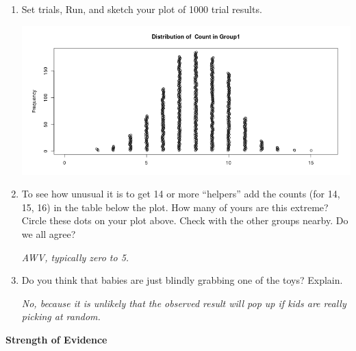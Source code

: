 \begin{enumerate}
\begin{key}
{\it 12 in my first, 8 in my second }
\end{key}

    \item  Set   trials, Run, and   
              sketch your plot of 1000 trial results. 
\begin{students}
  \vspace{4cm}
\end{students}

\begin{key}
    \includegraphics[width=.8\linewidth]{../plots/Helper16.png}
\end{key}
\item To see how unusual it is to get 14 or more ``helpers'' add the
  counts (for 14, 15, 16) in the table below the plot.
   How many of yours are this extreme? Circle
  these dots on your plot above. Check with the other groups
  nearby. Do we all agree?
\begin{students}
  \vspace{1.5cm}
\end{students}

\begin{key}
{\it  AWV, typically zero to 5.
}
\end{key}
\item  Do you think that babies are just blindly grabbing one of
      the toys? Explain.
\begin{students}
  \vspace{2.5cm}
\end{students}

\begin{key}
  {\it No, because it is unlikely that the observed result will pop up
    if  kids are really picking at random. }
\end{key}

  \end{enumerate}
\begin{center}
        {\large\bf Strength of Evidence}
 \end{center}
